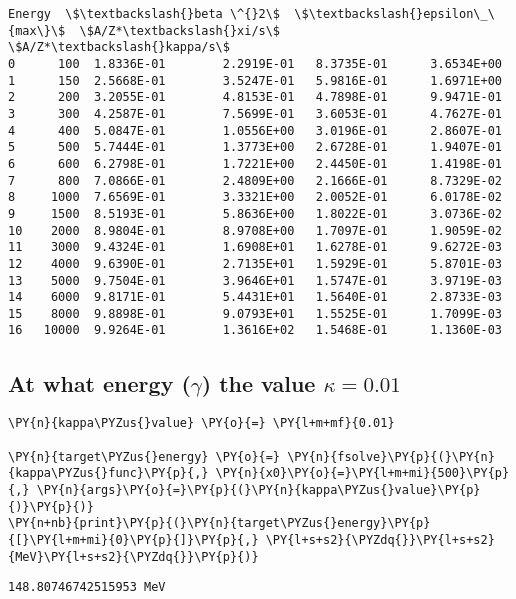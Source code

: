     
    \begin{Verbatim}[commandchars=\\\{\}]
    Energy  \$\textbackslash{}beta \^{}2\$  \$\textbackslash{}epsilon\_\{max\}\$  \$A/Z*\textbackslash{}xi/s\$  \$A/Z*\textbackslash{}kappa/s\$
0      100  1.8336E-01        2.2919E-01   8.3735E-01      3.6534E+00
1      150  2.5668E-01        3.5247E-01   5.9816E-01      1.6971E+00
2      200  3.2055E-01        4.8153E-01   4.7898E-01      9.9471E-01
3      300  4.2587E-01        7.5699E-01   3.6053E-01      4.7627E-01
4      400  5.0847E-01        1.0556E+00   3.0196E-01      2.8607E-01
5      500  5.7444E-01        1.3773E+00   2.6728E-01      1.9407E-01
6      600  6.2798E-01        1.7221E+00   2.4450E-01      1.4198E-01
7      800  7.0866E-01        2.4809E+00   2.1666E-01      8.7329E-02
8     1000  7.6569E-01        3.3321E+00   2.0052E-01      6.0178E-02
9     1500  8.5193E-01        5.8636E+00   1.8022E-01      3.0736E-02
10    2000  8.9804E-01        8.9708E+00   1.7097E-01      1.9059E-02
11    3000  9.4324E-01        1.6908E+01   1.6278E-01      9.6272E-03
12    4000  9.6390E-01        2.7135E+01   1.5929E-01      5.8701E-03
13    5000  9.7504E-01        3.9646E+01   1.5747E-01      3.9719E-03
14    6000  9.8171E-01        5.4431E+01   1.5640E-01      2.8733E-03
15    8000  9.8898E-01        9.0793E+01   1.5525E-01      1.7099E-03
16   10000  9.9264E-01        1.3616E+02   1.5468E-01      1.1360E-03
    \end{Verbatim}

    
    \hypertarget{at-what-energy-gamma-the-value-kappa-0.01}{%
\subsection{\texorpdfstring{At what energy (\(\gamma\)) the value
\(\kappa = 0.01\)}{At what energy (\textbackslash gamma) the value \textbackslash kappa = 0.01}}\label{at-what-energy-gamma-the-value-kappa-0.01}}

    \begin{tcolorbox}[breakable, size=fbox, boxrule=1pt, pad at break*=1mm,colback=cellbackground, colframe=cellborder]
\begin{Verbatim}[commandchars=\\\{\}]
\PY{n}{kappa\PYZus{}value} \PY{o}{=} \PY{l+m+mf}{0.01}

\PY{n}{target\PYZus{}energy} \PY{o}{=} \PY{n}{fsolve}\PY{p}{(}\PY{n}{kappa\PYZus{}func}\PY{p}{,} \PY{n}{x0}\PY{o}{=}\PY{l+m+mi}{500}\PY{p}{,} \PY{n}{args}\PY{o}{=}\PY{p}{(}\PY{n}{kappa\PYZus{}value}\PY{p}{)}\PY{p}{)}
\PY{n+nb}{print}\PY{p}{(}\PY{n}{target\PYZus{}energy}\PY{p}{[}\PY{l+m+mi}{0}\PY{p}{]}\PY{p}{,} \PY{l+s+s2}{\PYZdq{}}\PY{l+s+s2}{MeV}\PY{l+s+s2}{\PYZdq{}}\PY{p}{)}
\end{Verbatim}
\end{tcolorbox}

    \begin{Verbatim}[commandchars=\\\{\}]
148.80746742515953 MeV
    \end{Verbatim}


    

